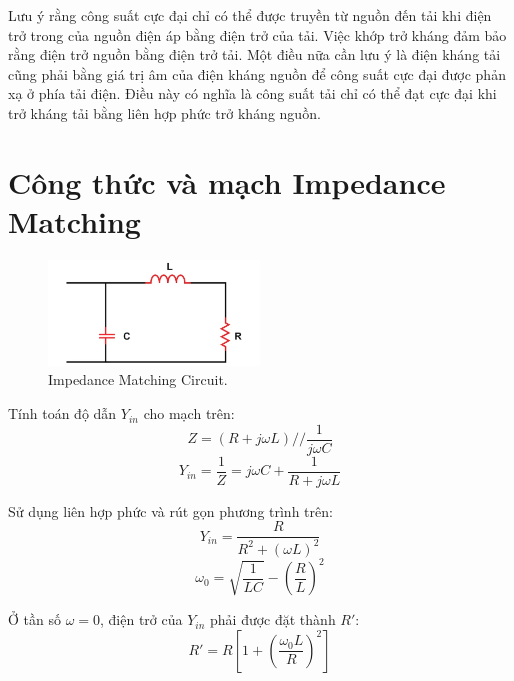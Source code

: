         Lưu ý rằng công suất cực đại chỉ có thể được truyền từ nguồn đến tải khi điện trở trong của nguồn điện áp bằng điện trở của tải. 
        Việc khớp trở kháng đảm bảo rằng điện trở nguồn bằng điện trở tải. 
        Một điều nữa cần lưu ý là điện kháng tải cũng phải bằng giá trị âm của điện kháng nguồn để công suất cực đại được phản xạ ở phía tải điện. 
        Điều này có nghĩa là công suất tải chỉ có thể đạt cực đại khi trở kháng tải bằng liên hợp phức trở kháng nguồn.\cite{allaboutcircuits_impedance}

    \section{Công thức và mạch Impedance Matching}
        \begin{figure}[h]
            \centering
            \includegraphics[width=0.5\textwidth]{figures/impedance_matching_circuit.png}
            \caption{Impedance Matching Circuit.}
            \label{fig:impedance_matching_circuit}
        \end{figure}

        Tính toán độ dẫn $Y_{in}$ cho mạch trên:
        \begin{equation}
            Z = \left(R + j\omega L\right) // \frac{1}{j\omega C}
        \end{equation}
        \begin{equation}
            Y_{in} = \frac{1}{Z} = j\omega C + \frac{1}{R + j\omega L}
        \end{equation}

        Sử dụng liên hợp phức và rút gọn phương trình trên:
        \begin{equation}
            Y_{in} = \frac{R}{R^2 + \left(\omega L\right)^2}
        \end{equation}
        \begin{equation}
            \omega_0 = \sqrt{\frac{1}{LC}} - \left(\frac{R}{L}\right)^2
        \end{equation}

        Ở tần số $\omega=0$, điện trở của $Y_{in}$ phải được đặt thành $R'$:
        \begin{equation}
            R' = R\left[1 + \left(\frac{\omega_0 L}{R}\right)^2\right]
        \end{equation}

